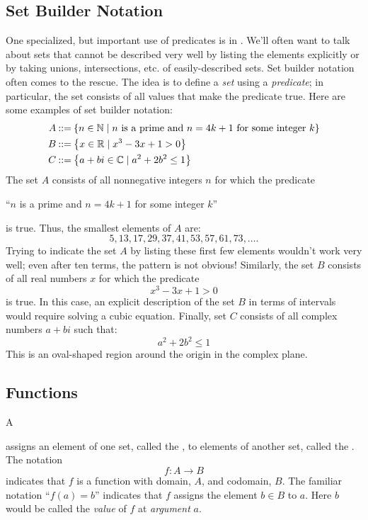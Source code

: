 \subsection{Set Builder Notation}

One specialized, but important use of predicates is in .  We'll often want to talk about sets that cannot
be described very well by listing the elements explicitly or by taking
unions, intersections, etc. of easily-described sets.  Set builder
notation often comes to the rescue.  The idea is to define a
\textit{set} using a \textit{predicate}; in particular, the set
consists of all values that make the predicate true.  Here are some
examples of set builder notation:
%
\begin{align*}
A & \mathbin{::=} \left\{n \in \mathbb{N} \mid \text{$n$ is a prime and $n =
    4k+1$ for some integer $k$}\right\} \\
B & \mathbin{::=} \left\{x \in \mathbb{R} \mid x^3 - 3 x + 1 > 0\right\} \\
C & \mathbin{::=} \left\{a + b i \in \mathbb{C} \mid a^2 + 2 b^2 \leq 1\right\}
\end{align*}
%
The set $A$ consists of all nonnegative integers $n$ for which the
predicate
%
\begin{center}
``$n$ is a prime and $n = 4k+1$ for some integer $k$''
\end{center}
%
is true.  Thus, the smallest elements of $A$ are:
%
\[
5, 13, 17, 29, 37, 41, 53, 57, 61, 73, \ldots.
\]
%
Trying to indicate the set $A$ by listing these first few elements
wouldn't work very well; even after ten terms, the pattern is not
obvious!  Similarly, the set $B$ consists of all real numbers $x$ for
which the predicate
%
\[
x^3 - 3x + 1 > 0
\]
%
is true.  In this case, an explicit description of the set $B$ in
terms of intervals would require solving a cubic equation.  Finally,
set $C$ consists of all complex numbers $a + b i$ such that:
%
\[
a^2 + 2 b^2 \leq 1
\]
%
This is an oval-shaped region around the origin in the complex plane.

\subsection{Functions}

A  assigns an element of
one set, called the , to elements of another set, called
the .  The notation
\[
f: A \to B
\]
indicates that $f$ is a function with domain, $A$, and codomain, $B$.  The
familiar notation ``$f(a) = b$'' indicates that $f$ assigns the element $b
\in B$ to $a$.  Here $b$ would be called the \emph{value} of $f$ at
\emph{argument} $a$.

